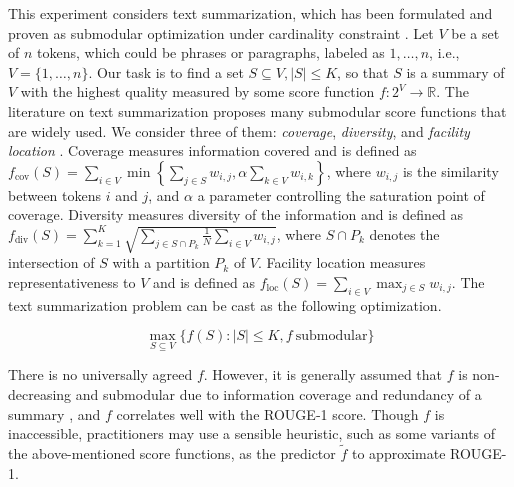 This experiment considers text summarization, which has been formulated and proven as submodular optimization under cardinality constraint \cite{lin2011class}. Let $V$ be a set of $n$ tokens, which could be phrases or paragraphs, labeled as $1, \dots, n$, i.e., $V = \{1, \dots, n\}$. Our task is to find a set $S \subseteq V, |S| \leq K$, so that $S$ is a summary of $V$ with the highest quality measured by some score function $f: 2^V \rightarrow \mathbb{R}$. The literature on text summarization proposes many submodular score functions that are widely used. We consider three of them: \textit{coverage}, \textit{diversity}, and \textit{facility location} \cite{lin2011class}. 
Coverage measures information covered and is defined as $f_{\text{cov}}(S) = \sum_{i \in V} \min \left\{\sum_{j \in S} w_{i, j}, \alpha \sum_{k \in V} w_{i, k}\right\}$, where $w_{i, j}$ is the similarity between tokens $i$ and $j$, and $\alpha$ a parameter controlling the saturation point of coverage. 
Diversity measures diversity of the information and is defined as $f_{\text{div}}(S) = \sum_{k=1}^{K} \sqrt{\sum_{j \in S \cap P_k} \frac{1}{N} \sum_{i \in V} w_{i, j}}$, where $S \cap P_k$ denotes the intersection of $S$ with a partition $P_k$ of $V$. 
Facility location measures representativeness to $V$ and is defined as $f_{\text{loc}}(S) = \sum_{i \in V} \max_{j \in S} w_{i, j}$. The text summarization problem can be cast as the following optimization. 

\[ \max_{S \subseteq V} \{f(S) : |S| \leq K, f ~\text{submodular} \} \]

There is no universally agreed $f$. However, it is generally assumed that $f$ is non-decreasing and submodular due to information coverage and redundancy of a summary \cite{lin2011class}, and $f$ correlates well with the ROUGE‐1 score. Though $f$ is inaccessible, practitioners may use a sensible heuristic, such as some variants of the above-mentioned score functions, as the predictor $\tilde{f}$ to approximate ROUGE-1.



